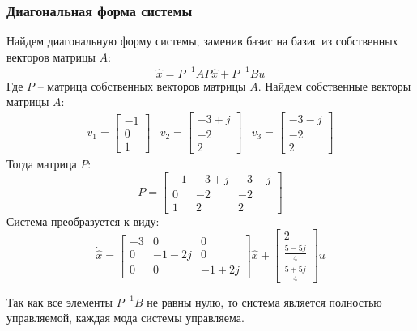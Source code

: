 \subsubsection{Диагональная форма системы}
Найдем диагональную форму системы, заменив базис на базис из собственных векторов матрицы $A$:
\begin{equation}
    \dot{\hat{x}} = P^{-1}AP\hat{x} + P^{-1}Bu
\end{equation}
Где $P$ -- матрица собственных векторов матрицы $A$. 
Найдем собственные векторы матрицы $A$:
\begin{equation}
    \begin{array}{ccc}
        v_1 = \begin{bmatrix} -1 \\ 0 \\ 1 \end{bmatrix} &
        v_2 = \begin{bmatrix} -3+j \\ -2 \\ 2 \end{bmatrix} &
        v_3 = \begin{bmatrix} -3-j \\ -2 \\ 2 \end{bmatrix} 
    \end{array}
\end{equation}
Тогда матрица $P$:
\begin{equation}
    P = \begin{bmatrix}
        -1 & -3+j & -3-j \\
        0 & -2 & -2 \\
        1 & 2 & 2
    \end{bmatrix}
\end{equation}
Система преобразуется к виду:
\begin{equation}
    \dot{\hat{x}} = \begin{bmatrix}
        -3 & 0 & 0 \\
        0 & -1-2j & 0 \\
        0 & 0 & -1+2j
    \end{bmatrix} \hat{x} + 
    \begin{bmatrix}
        2 \\
        \frac{5 - 5j}{4} \\ 
        \frac{5 + 5j}{4}
    \end{bmatrix} u
\end{equation}

Так как все элементы $P^{-1}B$ не равны нулю, то система является полностью управляемой, каждая мода системы управляема.

